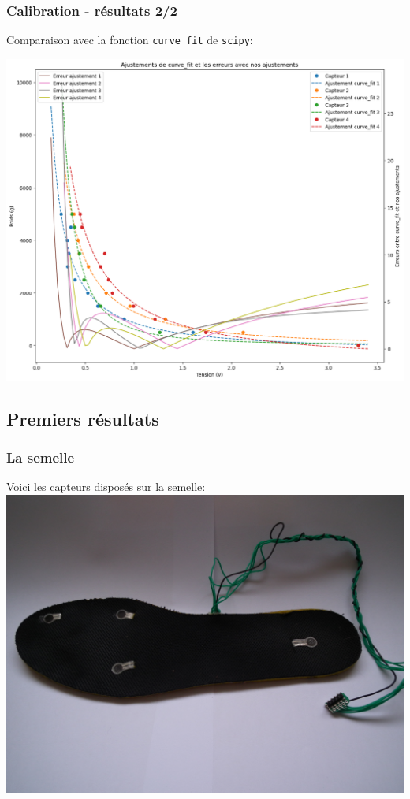 \begin{frame}
    \frametitle{Calibration - résultats 2/2}
    Comparaison avec la fonction \texttt{curve\_fit} de \texttt{scipy}:
    \begin{center}
        \includegraphics[scale=0.3]{./figures/cal_02.png}
    \end{center}
\end{frame}

\subsection{Premiers résultats}
\begin{frame}
    \frametitle{La semelle}
    Voici les capteurs disposés sur la semelle:
    \includegraphics[width=\textwidth]{./figures/sem_00.jpg}

\end{frame}

